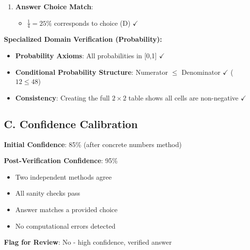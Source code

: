 \documentclass[]{article}
\begin{document}
\begin{verificationbox}
\begin{enumerate}[leftmargin=*]
    \item \textbf{Answer Choice Match}:
    \begin{itemize}
        \item $\frac{1}{4} = 25\%$ corresponds to choice (D) $\checkmark$
    \end{itemize}
\end{enumerate}

\textbf{Specialized Domain Verification (Probability):}
\begin{itemize}[leftmargin=*]
    \item \textbf{Probability Axioms}: All probabilities in [0,1] $\checkmark$
    \item \textbf{Conditional Probability Structure}: Numerator $\leq$ Denominator $\checkmark$ ($12 \leq 48$)
    \item \textbf{Consistency}: Creating the full $2 \times 2$ table shows all cells are non-negative $\checkmark$
\end{itemize}

\subsection*{C. Confidence Calibration}

\textbf{Initial Confidence}: 85\% (after concrete numbers method)

\textbf{Post-Verification Confidence}: 95\%
\begin{itemize}[leftmargin=*]
    \item Two independent methods agree
    \item All sanity checks pass
    \item Answer matches a provided choice
    \item No computational errors detected
\end{itemize}

\textbf{Flag for Review}: No - high confidence, verified answer
\end{verificationbox}
\end{document}
